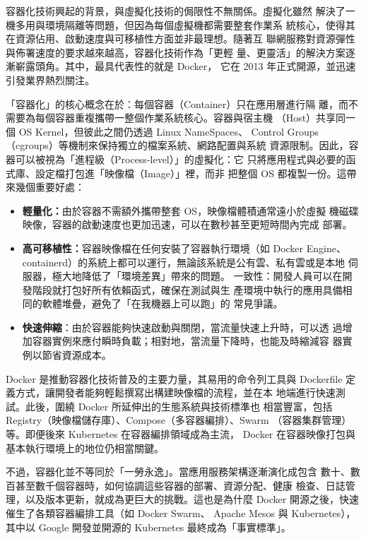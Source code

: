 \documentclass[12pt,a4paper]{article}
\begin{document}
\begin{enumerate}[label={(\zhdig*)}, leftmargin=2\parindent, listparindent=\parindent]
\begin{enumerate}[label={(\arabic*)}, leftmargin=\parindent, listparindent=\parindent]
容器化技術興起的背景，與虛擬化技術的侷限性不無關係。虛擬化雖然
解決了一機多用與環境隔離等問題，但因為每個虛擬機都需要整套作業系
統核心，使得其在資源佔用、啟動速度與可移植性方面並非最理想。隨著互
聯網服務對資源彈性與佈署速度的要求越來越高，容器化技術作為「更輕
量、更靈活」的解決方案逐漸嶄露頭角。其中，最具代表性的就是 Docker，
它在 2013 年正式開源，並迅速引發業界熱烈關注。

「容器化」的核心概念在於：每個容器（Container）只在應用層進行隔
離，而不需要為每個容器重複攜帶一整個作業系統核心。容器與宿主機
（Host）共享同一個 OS Kernel，但彼此之間仍透過 Linux NameSpaces、
Control Groups（cgroups）等機制來保持獨立的檔案系統、網路配置與系統
資源限制。因此，容器可以被視為「進程級（Process-level）」的虛擬化：它
只將應用程式與必要的函式庫、設定檔打包進「映像檔（Image）」裡，而非
把整個 OS 都複製一份。這帶來幾個重要好處：
\begin{itemize}[leftmargin=\parindent, listparindent=\parindent]

\item\textbf{輕量化：}由於容器不需額外攜帶整套 OS，映像檔體積通常遠小於虛擬
機磁碟映像，容器的啟動速度也更加迅速，可以在數秒甚至更短時間內完成
部署。

\item\textbf{高可移植性：}容器映像檔在任何安裝了容器執行環境（如 Docker Engine、
containerd）的系統上都可以運行，無論該系統是公有雲、私有雲或是本地
伺服器，極大地降低了「環境差異」帶來的問題。
一致性：開發人員可以在開發階段就打包好所有依賴函式，確保在測試與生
產環境中執行的應用具備相同的軟體堆疊，避免了「在我機器上可以跑」的
常見爭議。

\item\textbf{快速伸縮}：由於容器能夠快速啟動與關閉，當流量快速上升時，可以透
過增加容器實例來應付瞬時負載；相對地，當流量下降時，也能及時縮減容
器實例以節省資源成本。
\end{itemize}

Docker 是推動容器化技術普及的主要力量，其易用的命令列工具與
Dockerfile 定義方式，讓開發者能夠輕鬆撰寫出構建映像檔的流程，並在本
地端進行快速測試。此後，圍繞 Docker 所延伸出的生態系統與技術標準也
相當豐富，包括 Registry（映像檔儲存庫）、Compose（多容器編排）、Swarm
（容器集群管理）等。即便後來 Kubernetes 在容器編排領域成為主流，
Docker 在容器映像打包與基本執行環境上的地位仍相當關鍵。

不過，容器化並不等同於「一勞永逸」。當應用服務架構逐漸演化成包含
數十、數百甚至數千個容器時，如何協調這些容器的部署、資源分配、健康
檢查、日誌管理，以及版本更新，就成為更巨大的挑戰。這也是為什麼
Docker 開源之後，快速催生了各類容器編排工具（如 Docker Swarm、
Apache Mesos 與 Kubernetes），其中以 Google 開發並開源的 Kubernetes
最終成為「事實標準」。


\end{enumerate}
\end{enumerate}
\end{document}
